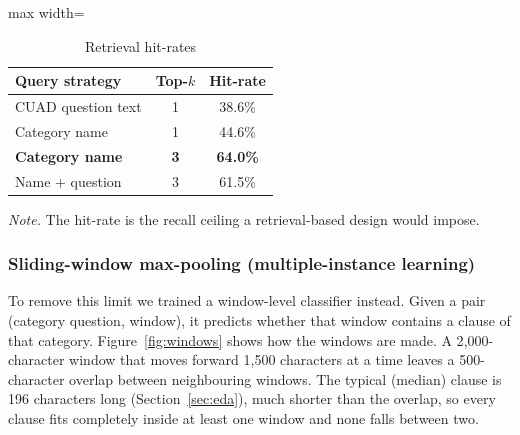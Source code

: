 \begin{table}[ht]
\centering
\caption{Retrieval hit-rates}
\label{tab:retrieval}
\begin{adjustbox}{max width=\textwidth}
\begin{tabular}{lcc}
\toprule
\textbf{Query strategy} & \textbf{Top-$k$} & \textbf{Hit-rate}\\
\midrule
CUAD question text        & 1 & 38.6\%\\
Category name             & 1 & 44.6\%\\
\textbf{Category name}    & \textbf{3} & \textbf{64.0\%}\\
Name + question           & 3 & 61.5\%\\
\bottomrule
\end{tabular}
\end{adjustbox}

{\footnotesize\singlespacing \emph{Note.} The hit-rate is the recall ceiling a retrieval-based design would impose.\par}
\end{table}

\subsubsection{Sliding-window max-pooling (multiple-instance learning)}
\label{sec:mil}
To remove this limit we trained a window-level classifier instead. Given a pair (category question, window), it predicts whether that window contains a clause of that category. Figure~\ref{fig:windows} shows how the windows are made. A 2{,}000-character window that moves forward 1{,}500 characters at a time leaves a 500-character overlap between neighbouring windows. The typical (median) clause is 196 characters long (Section~\ref{sec:eda}), much shorter than the overlap, so every clause fits completely inside at least one window and none falls between two.

